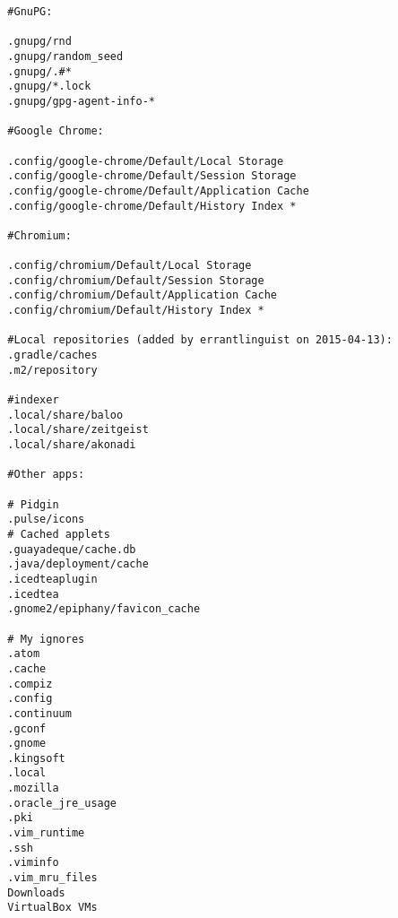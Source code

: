 \documentclass[12pt]{article}
\begin{document}
\begin{Verbatim}
  #GnuPG:

  .gnupg/rnd
  .gnupg/random_seed
  .gnupg/.#*
  .gnupg/*.lock
  .gnupg/gpg-agent-info-*

  #Google Chrome:

  .config/google-chrome/Default/Local Storage
  .config/google-chrome/Default/Session Storage
  .config/google-chrome/Default/Application Cache
  .config/google-chrome/Default/History Index *

  #Chromium:

  .config/chromium/Default/Local Storage
  .config/chromium/Default/Session Storage
  .config/chromium/Default/Application Cache
  .config/chromium/Default/History Index *

  #Local repositories (added by errantlinguist on 2015-04-13):
  .gradle/caches
  .m2/repository

  #indexer
  .local/share/baloo
  .local/share/zeitgeist
  .local/share/akonadi

  #Other apps:

  # Pidgin
  .pulse/icons
  # Cached applets
  .guayadeque/cache.db
  .java/deployment/cache
  .icedteaplugin
  .icedtea
  .gnome2/epiphany/favicon_cache

  # My ignores
  .atom
  .cache
  .compiz
  .config
  .continuum
  .gconf
  .gnome
  .kingsoft
  .local
  .mozilla
  .oracle_jre_usage
  .pki
  .vim_runtime
  .ssh
  .viminfo
  .vim_mru_files
  Downloads
  VirtualBox VMs
\end{Verbatim}
\end{document}
